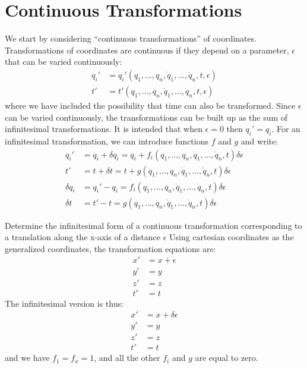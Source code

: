 \section{Continuous Transformations}
We start by considering ``continuous transformations'' of coordinates. Transformations of coordinates are continuous if they depend on a parameter, $\epsilon$ that can be varied continuously:
\begin{align}
q_i'&=q_i'(q_1,\dots ,q_n,\dot{q}_1,\dots ,\dot{q}_n, t, \epsilon)\nonumber\\
t'&=t'(q_1,\dots ,q_n,\dot{q}_1,\dots ,\dot{q}_n, t, \epsilon)
\end{align}
where we have included the possibility that time can also be transformed. Since $\epsilon$ can be varied continuously, the transformations can be built up as the sum of infinitesimal transformations. It is intended that when $\epsilon=0$ then $q_i'=q_i$. For an infinitesimal transformation, we can introduce functions $f$ and $g$ and write:
\begin{align}
q_i'&=q_i+\delta q_i=q_i+f_i(q_1,\dots ,q_n,\dot{q}_1,\dots ,\dot{q}_n, t)\delta\epsilon\nonumber\\
t'&=t+\delta t=t+g(q_1,\dots ,q_n,\dot{q}_1,\dots ,\dot{q}_n, t)\delta\epsilon\nonumber\\
\delta q_i&=q_i'-q_i=f_i(q_1,\dots ,q_n,\dot{q}_1,\dots ,\dot{q}_n, t)\delta\epsilon\nonumber\\
\delta t&=t'-t=g(q_1,\dots ,q_n,\dot{q}_1,\dots ,\dot{q}_n, t)\delta\epsilon
\end{align}
\begin{example}{0pt}{Determine the infinitesimal form of a continuous transformation corresponding to a translation along the x-axis of a distance $\epsilon$}{}
Using cartesian coordinates as the generalized coordinates, the transformation equations are:
\begin{align*}
x'&=x+\epsilon\\
y'&=y\\
z'&=z\\
t'&=t
\end{align*}
The infinitesimal version is thus:
\begin{align*}
x'&=x+\delta\epsilon\\
y'&=y\\
z'&=z\\
t'&=t
\end{align*}
and we have $f_1=f_x=1$, and all the other $f_i$ and $g$ are equal to zero.
\end{example}

